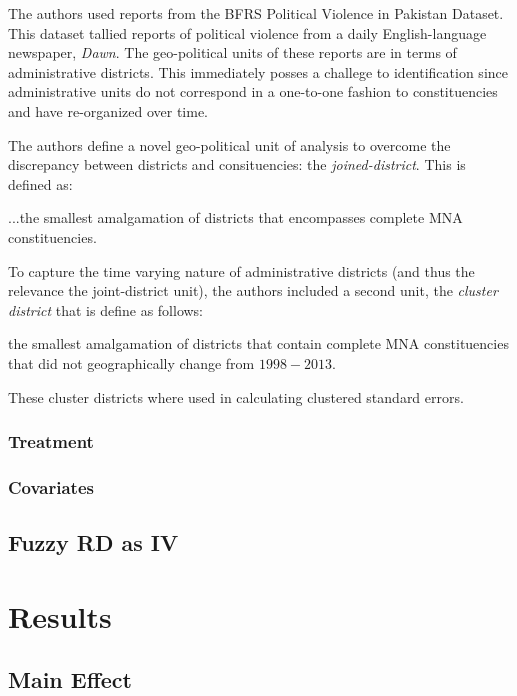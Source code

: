 \documentclass{scrartcl}
\begin{document}
The authors used reports from the BFRS Political Violence in Pakistan Dataset. This dataset tallied reports of political violence from a daily English-language newspaper, \textit{Dawn}. The geo-political units of these reports are in terms of administrative districts. This immediately posses a challege to identification since administrative units do not correspond in a one-to-one fashion to constituencies and have re-organized over time.

The authors define a novel geo-political unit of analysis to overcome the discrepancy between districts and consituencies: the \textit{joined-district}. 
This is defined as:
\begin{displayquote}
...the smallest amalgamation of districts that encompasses complete MNA constituencies. 
\end{displayquote}

To capture the time varying nature of administrative districts (and thus the relevance the joint-district unit), the authors included a second unit, the \textit{cluster district} that is define as follows:

\begin{displayquote}
the smallest amalgamation of districts that contain complete MNA constituencies that did not geographically change from $1998 - 2013$.
\end{displayquote}

These cluster districts where used in calculating clustered standard errors.

\subsubsection{Treatment}

\subsubsection{Covariates}

\subsection{Fuzzy RD as IV}


\section{Results}

\subsection{Main Effect}
\end{document}
